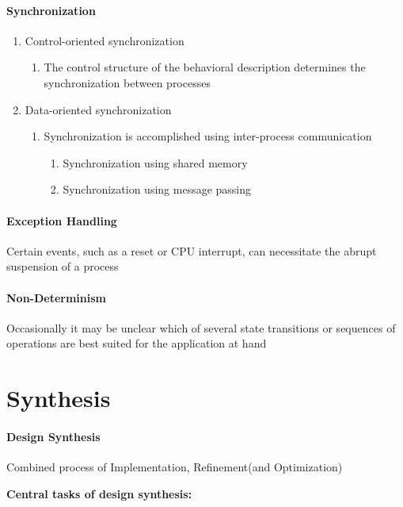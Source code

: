 \documentclass[english]{latex4ei/latex4ei_sheet}
\begin{document}
\paragraph{Synchronization}
\begin{enumerate}
  \item Control-oriented synchronization
    \begin{enumerate}
    	\item The control structure of the behavioral description determines the synchronization between processes
    \end{enumerate}
  \item Data-oriented synchronization
    \begin{enumerate}
    	\item Synchronization is accomplished using inter-process communication
	  \begin{enumerate}
	    \item Synchronization using shared memory
	    \item Synchronization using message passing
	  \end{enumerate}
    \end{enumerate}
\end{enumerate}
 
\paragraph{Exception Handling} Certain events, such as a reset or CPU interrupt, can necessitate the abrupt suspension of a process

\paragraph{Non-Determinism} Occasionally it may be unclear which of several state transitions or
sequences of operations are best suited for the application at hand

\section{Synthesis}

\paragraph{Design Synthesis} 
Combined process of Implementation, Refinement(and Optimization)

\textbf{Central tasks of design synthesis:}
\end{document}
